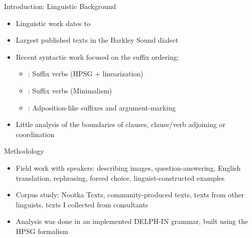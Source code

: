 \begin{frame}{Introduction: Linguistic Background}
\begin{itemize}
\item Linguistic work dates to \cite{sapir1911}
\item Largest published texts in the Barkley Sound dialect \citep{sapir1939, sapir1955}
\item Recent syntactic work focused on the suffix ordering:
\begin{itemize}
\item \cite{waldie2004}: Suffix verbs (HPSG + linearization)
\item \cite{wojdak2005}: Suffix verbs (Minimalism)
\item \cite{woo2007b}: Adposition-like suffixes and argument-marking
\end{itemize}
\item Little analysis of the boundaries of clauses, clause/verb adjoining or coordination \citep{jacobsen1993}
\end{itemize}
\end{frame}

\begin{frame}{Methodology}
\begin{itemize}
\item Field work with speakers: describing images, question-answering, English translation, rephrasing, forced choice, linguist-constructed examples
\item Corpus study: Nootka Texts, community-produced texts, texts from other linguists, texts I collected from consultants
\item Analysis was done in an implemented DELPH-IN grammar, built using the HPSG formalism
\end{itemize}
\end{frame}